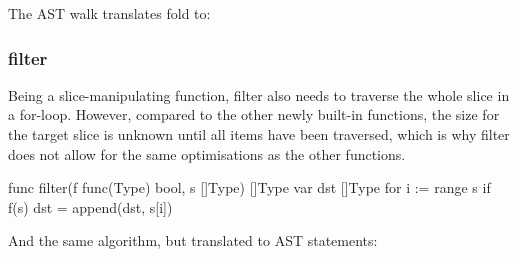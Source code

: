The AST walk translates fold to:
\begin{code}
\end{code}
\subsubsection{filter}

Being a slice-manipulating function, filter also needs to traverse the whole
slice in a for-loop. However, compared to the other newly built-in functions,
the size for the target slice is unknown until all items have been traversed,
which is why filter does not allow for the same optimisations as the other
functions.

\begin{code}
    \begin{gocode}
func filter(f func(Type) bool, s []Type) []Type {
    var dst []Type
    for i := range s {
            if f(s) {
                dst = append(dst, s[i])
            }
    }
}
    \end{gocode}
\end{code}
And the same algorithm, but translated to AST statements:

\begin{code}
\end{code}
